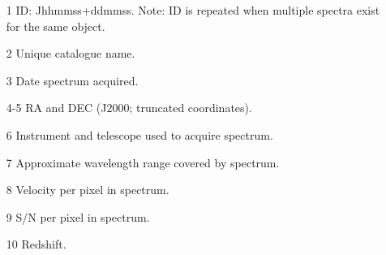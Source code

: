 \begin{itemize}

\item[1] ID: Jhhmmss+ddmmss. Note: ID is repeated when multiple spectra exist for the same object. 

\item[2] Unique catalogue name.   

\item[3] Date spectrum acquired. 

\item[4-5] RA and DEC (J$2000$; truncated coordinates).  

\item[6] Instrument and telescope used to acquire spectrum. 

\item[7] Approximate wavelength range covered by spectrum. 

\item[8] Velocity per pixel in spectrum. 

\item[9] S/N per pixel in spectrum. 

\item[10] Redshift. 

\end{itemize}

